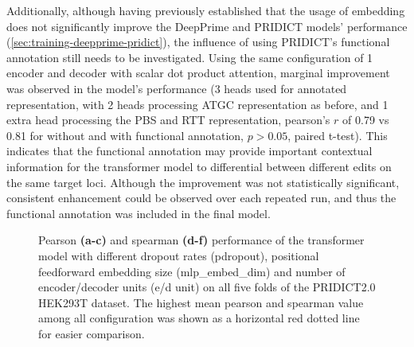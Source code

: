 Additionally, although having previously established that the usage of embedding does not significantly improve the DeepPrime and PRIDICT models' performance (\autoref{sec:training-deepprime-pridict}), the influence of using PRIDICT's functional annotation still needs to be investigated. Using the same configuration of 1 encoder and decoder with scalar dot product attention, marginal improvement was observed in the model's performance (3 heads used for annotated representation, with 2 heads processing ATGC representation as before, and 1 extra head processing the PBS and RTT representation, pearson's $r$ of 0.79 vs 0.81 for without and with functional annotation, $p>0.05$, paired t-test). This indicates that the functional annotation may provide important contextual information for the transformer model to differential between different edits on the same target loci. Although the improvement was not statistically significant, consistent enhancement could be observed over each repeated run, and thus the functional annotation was included in the final model.


\begin{figure}
    \caption[Transformer Model Hyperparameter Tuning]{Pearson \textbf{(a-c)} and spearman \textbf{(d-f)} performance of the transformer model with different dropout rates (pdropout), positional feedforward embedding size (mlp\_embed\_dim) and number of encoder/decoder units (e/d unit) on all five folds of the PRIDICT2.0 HEK293T dataset. The highest mean pearson and spearman value among all configuration was shown as a horizontal red dotted line for easier comparison.}
    \label{fig:transformer-tune}
\end{figure}

